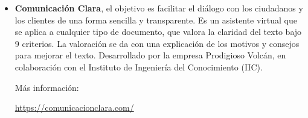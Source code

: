 \begin{itemize}
\item
{\textbf{Comunicación Clara}}, el objetivo es facilitar el diálogo con los ciudadanos y los clientes de una forma sencilla y transparente. Es un asistente virtual que se aplica a cualquier tipo de documento, que valora la claridad del texto bajo 9 criterios. La valoración se da con una explicación de los motivos y consejos para mejorar el texto. Desarrollado por la empresa Prodigioso Volcán, en colaboración con el Instituto de Ingeniería del Conocimiento (IIC).

Más información:

\href{https://comunicacionclara.com/}{https://comunicacionclara.com/}



\end{itemize}








